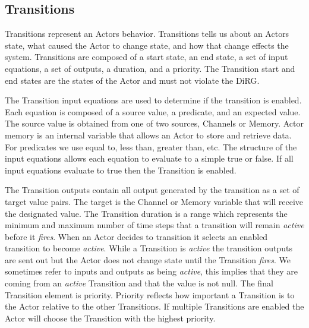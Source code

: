 \subsection{Transitions}
Transitions represent an Actors behavior.  Transitions tells us about an Actors state, what caused the Actor to change state, and how that change effects the system.  Transitions are composed of a start state, an end state, a set of input equations, a set of outputs, a duration, and a priority.  The Transition start and end states are the states of the Actor and must not violate the DiRG.  

The Transition input equations are used to determine if the transition is enabled.  Each equation is composed of a source value, a predicate, and an expected value.  The source value is obtained from one of two sources, Channels or Memory.  Actor memory is an internal variable that allows an Actor to store and retrieve data.  For predicates we use equal to, less than, greater than, etc.  The structure of the input equations allows each equation to evaluate to a simple true or false.  If all input equations evaluate to true then the Transition is enabled.  

The Transition outputs contain all output generated by the transition as a set of target value pairs.  The target is the Channel or Memory variable that will receive the designated value.  The Transition duration is a range which represents the minimum and maximum number of time steps that a transition will remain {\em active} before it {\em fires}.  When an Actor decides to transition it selects an enabled transition to become {\em active}.  While a Transition is {\em active} the transition outputs are sent out but the Actor does not change state until the Transition {\em fires}.  We sometimes refer to inputs and outputs as being {\em active}, this implies that they are coming from an {\em active} Transition and that the value is not null.  The final Transition element is priority.  Priority reflects how important a Transition is to the Actor relative to the other Transitions.  If multiple Transitions are enabled the Actor will choose the Transition with the highest priority.

